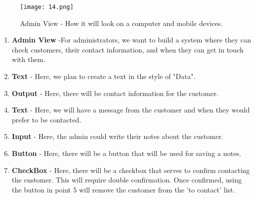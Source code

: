 \documentclass{article}
\begin{document}
\begin{itemize}
\begin{figure}[h]
    \centering
    \texttt{[image: 14.png]}
    \caption{Admin View - How it will look on a computer and mobile devices.}
    \label{fig:enter-label}
\end{figure}

\begin{enumerate}
    \item \textbf{Admin View} -For administrators, we want to build a system where they can check customers, their contact information, and when they can get in touch with them.
    \item \textbf{Text} - Here, we plan to create a text in the style of "Data".
    \item \textbf{Output}  - Here, there will be contact information for the customer.
    \item \textbf{Text} - Here, we will have a message from the customer and when they would prefer to be contacted.
     \item \textbf{Input} - Here, the admin could write their notes about the customer.
     \item \textbf{Button} - Here, there will be a button that will be used for saving a notes.
     \item \textbf{CheckBox} - Here, there will be a checkbox that serves to confirm contacting the customer. This will require double confirmation. Once confirmed, using the button in point 5 will remove the customer from the 'to contact' list.
\end{enumerate} 
    
\end{itemize}

    
    
\end{document}
